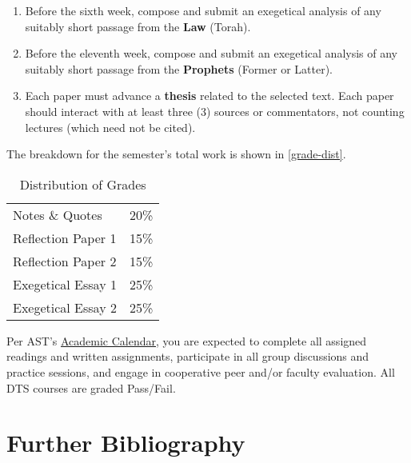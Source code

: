 \documentclass[titlepage]{article}
\newcommand\policy{../policy}
\begin{document}
\begin{enumerate}
	\begin{enumerate}

		\item Before the sixth week, compose and submit an exegetical
		analysis of any suitably short passage from the \textbf{Law}
		(Torah).

		\item Before the eleventh week, compose and submit an
		exegetical analysis of any suitably short passage from the
		\textbf{Prophets} (Former or Latter).

		\item Each paper must advance a \textbf{thesis} related to the
		selected text. Each paper should interact with at least three
		(3) sources or commentators, not counting lectures (which need
		not be cited).

	\end{enumerate}

\end{enumerate}

The breakdown for the semester's total work is shown in
\autoref{grade-dist}.

\begin{table}[htbp]
  \centering
  {\lining
  \begin{tabular}{lr}
    \toprule
    Notes \& Quotes     & 20\% \\
    Reflection Paper 1  & 15\% \\
    Reflection Paper 2  & 15\% \\
    Exegetical Essay 1  & 25\% \\
    Exegetical Essay 2  & 25\% \\
    \bottomrule
  \end{tabular}}
  \caption{Distribution of Grades}
  \label{grade-dist}
\end{table}

Per AST's \href{https://www.astheology.ns.ca/students/resources.html}{Academic Calendar},
you are expected to complete all assigned readings and written
assignments, participate in all group discussions and practice sessions,
and engage in cooperative peer and/or faculty evaluation. All DTS
courses are graded Pass/Fail.

%


\section{Further Bibliography}
\label{bib}
\end{document}
